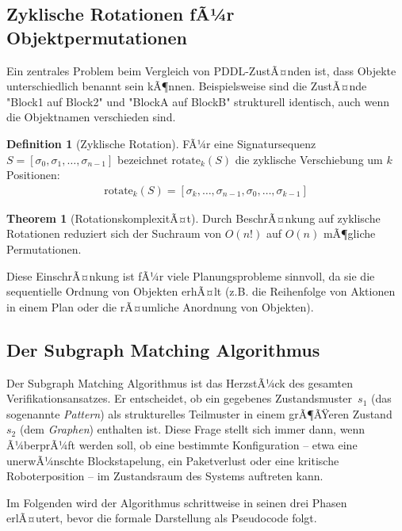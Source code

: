 ﻿\documentclass[a4paper,12pt]{article}
\theoremstyle{definition}
\newtheorem{definition}{Definition}[section]
\newtheorem{theorem}{Theorem}[section]
\begin{document}
\subsection{Zyklische Rotationen fÃ¼r Objektpermutationen}

Ein zentrales Problem beim Vergleich von PDDL-ZustÃ¤nden ist, dass Objekte unterschiedlich benannt sein kÃ¶nnen. Beispielsweise sind die ZustÃ¤nde "Block1 auf Block2" und "BlockA auf BlockB" strukturell identisch, auch wenn die Objektnamen verschieden sind.

\begin{definition}[Zyklische Rotation]
	FÃ¼r eine Signatursequenz $S = [\sigma_0, \sigma_1, \ldots, \sigma_{n-1}]$
	bezeichnet $\text{rotate}_k(S)$ die zyklische Verschiebung um $k$ Positionen:
	\begin{align}
	\text{rotate}_k(S) = [\sigma_k, \ldots, \sigma_{n-1}, \sigma_0, \ldots, \sigma_{k-1}]
	\end{align}
\end{definition}

\begin{theorem}[RotationskomplexitÃ¤t]
	Durch BeschrÃ¤nkung auf zyklische Rotationen reduziert sich der Suchraum von $O(n!)$ auf $O(n)$ mÃ¶gliche Permutationen.
\end{theorem}

Diese EinschrÃ¤nkung ist fÃ¼r viele Planungsprobleme sinnvoll, da sie die sequentielle Ordnung von Objekten erhÃ¤lt (z.B. die Reihenfolge von Aktionen in einem Plan oder die rÃ¤umliche Anordnung von Objekten).

\subsection{Der Subgraph Matching Algorithmus}

Der Subgraph Matching Algorithmus ist das HerzstÃ¼ck des gesamten Verifikationsansatzes. Er entscheidet, ob ein gegebenes Zustandsmuster~$s_1$ (das sogenannte \emph{Pattern}) als strukturelles Teilmuster in einem grÃ¶ÃŸeren Zustand~$s_2$ (dem \emph{Graphen}) enthalten ist. Diese Frage stellt sich immer dann, wenn Ã¼berprÃ¼ft werden soll, ob eine bestimmte Konfiguration -- etwa eine unerwÃ¼nschte Blockstapelung, ein Paketverlust oder eine kritische Roboterposition -- im Zustandsraum des Systems auftreten kann.

Im Folgenden wird der Algorithmus schrittweise in seinen drei Phasen erlÃ¤utert, bevor die formale Darstellung als Pseudocode folgt.
\end{document}
